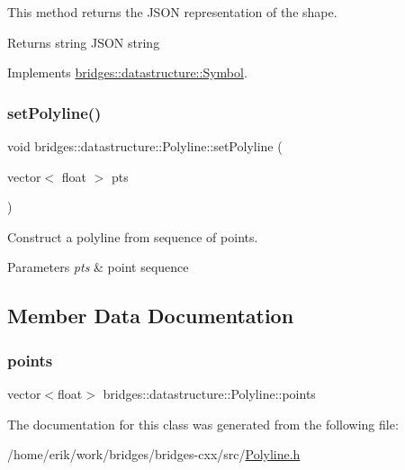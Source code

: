 This method returns the J\+S\+ON representation of the shape. 

\begin{DoxyReturn}{Returns}
string J\+S\+ON string 
\end{DoxyReturn}


Implements \hyperlink{classbridges_1_1datastructure_1_1_symbol_a8044b3da559dcd9de8510ae339f126c8}{bridges\+::datastructure\+::\+Symbol}.

\mbox{\label{classbridges_1_1datastructure_1_1_polyline_ab1fb850dabd3ed58fd4f916992a0b9a6}} 
\subsubsection{\texorpdfstring{set\+Polyline()}{setPolyline()}}
{\footnotesize\ttfamily void bridges\+::datastructure\+::\+Polyline\+::set\+Polyline (\begin{DoxyParamCaption}\item[{vector$<$ float $>$}]{pts }\end{DoxyParamCaption})\hspace{0.3cm}{\ttfamily [inline]}}



Construct a polyline from sequence of points. 


\begin{DoxyParams}{Parameters}
{\em pts} & point sequence \\
\hline
\end{DoxyParams}


\subsection{Member Data Documentation}
\mbox{\label{classbridges_1_1datastructure_1_1_polyline_a0df21b6c3cc82930a93a495de5affda7}} 
\subsubsection{\texorpdfstring{points}{points}}
{\footnotesize\ttfamily vector$<$float$>$ bridges\+::datastructure\+::\+Polyline\+::points\hspace{0.3cm}{\ttfamily [protected]}}



The documentation for this class was generated from the following file\+:\begin{DoxyCompactItemize}
\item 
/home/erik/work/bridges/bridges-\/cxx/src/\hyperlink{_polyline_8h}{Polyline.\+h}\end{DoxyCompactItemize}

